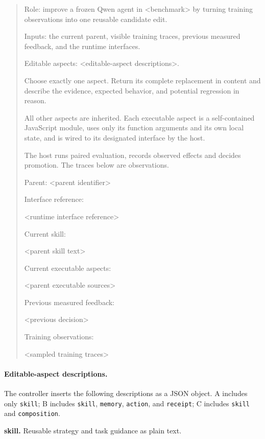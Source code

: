 \begin{quote}\small\raggedright
Role: improve a frozen Qwen agent in \textless{}benchmark\textgreater{} by turning training observations into one reusable candidate edit.
\par
Inputs: the current parent, visible training traces, previous measured feedback, and the runtime interfaces.
\par
Editable aspects: \textless{}editable-aspect descriptions\textgreater{}.
\par
Choose exactly one aspect. Return its complete replacement in content and describe the evidence, expected behavior, and potential regression in reason.
\par
All other aspects are inherited. Each executable aspect is a self-contained JavaScript module, uses only its function arguments and its own local state, and is wired to its designated interface by the host.
\par
The host runs paired evaluation, records observed effects and decides promotion. The traces below are observations.
\par
Parent: \textless{}parent identifier\textgreater{}
\par
Interface reference:
\par
\textless{}runtime interface reference\textgreater{}
\par
Current skill:
\par
\textless{}parent skill text\textgreater{}
\par
Current executable aspects:
\par
\textless{}parent executable sources\textgreater{}
\par
Previous measured feedback:
\par
\textless{}previous decision\textgreater{}
\par
Training observations:
\par
\textless{}sampled training traces\textgreater{}
\end{quote}

\paragraph{Editable-aspect descriptions.}
The controller inserts the following descriptions as a JSON object. A includes only \texttt{skill}; B includes \texttt{skill}, \texttt{memory}, \texttt{action}, and \texttt{receipt}; C includes \texttt{skill} and \texttt{composition}.

\noindent\textbf{skill.} Reusable strategy and task guidance as plain text.\par

